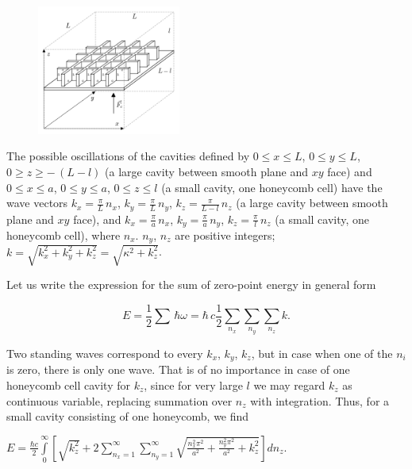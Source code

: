 \documentclass[twoside, 10pt]{article}
\begin{document}
\begin{multicols}{2}
\begin{figure}
\begin{center}
\includegraphics[width=0.42\textwidth]{honeycomb_box_H.png}
\caption{}{}
\end{center}
\label{fig:honeycomb_box_H}
\end{figure}

    The possible oscillations of the cavities defined by
\(0 \leq x \leq L\), \(0 \leq y \leq L\), \(0 \geq z \geq -\,(L-l)\) (a large cavity between smooth
plane and \(xy\) face)
and
\(0 \leq x \leq a\), \(0 \leq y \leq a\), \(0 \leq z \leq l\) (a small cavity, one honeycomb cell)
    have the wave vectors
\(k_x = \frac{\pi}{L}\,n_x\), \(k_y = \frac{\pi}{L}\,n_y\),
\(k_z = \frac{\pi}{L-l}\,n_z\) (a large cavity between smooth plane and
\(xy\) face),
and
\(k_x = \frac{\pi}{a}\,n_x\), \(k_y = \frac{\pi}{a}\,n_y\),
\(k_z = \frac{\pi}{l}\,n_z\) (a small cavity, one honeycomb cell),
where \(n_x\). \(n_y\), \(n_z\) are positive integers;
\(k = \sqrt{k_x^2+k_y^2+k_z^2} = \sqrt{\kappa^2+k_z^2}\).

Let us write the expression for the sum of zero-point energy in general form

\begin{equation}
E = \frac{1}{2}\sum\,\hbar\omega = \hbar\,c\frac{1}{2}\sum\limits_{n_x}^{}\sum\limits_{n_y}^{}\sum\limits_{n_z}^{}k.
\end{equation}

    Two standing waves correspond to every \(k_x\), \(k_y\), \(k_z\), but in case when
one of the \(n_i\) is zero, there is only one wave. That is of no importance
in case of one honeycomb cell cavity for \(k_z\),
since for very large \(l\) we may regard \(k_z\) as
continuous variable, replacing summation over \(n_z\) with integration.
Thus, for a small cavity consisting of one honeycomb, we find

\noindent
\(E = \frac{\hbar c}{2}\int\limits_{0}^{\infty}\left[{\sqrt{k_z^2}+2\sum\limits_{n_x=1}^{\infty}\sum\limits_{n_y=1}^{\infty}\sqrt{\frac{n_x^2\pi^2}{a^2}+\frac{n_y^2\pi^2}{a^2}+k_z^2}}\right]d{n_z}\).


\end{multicols}
\end{document}
